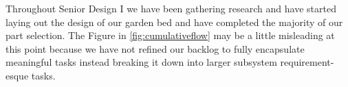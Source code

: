 Throughout Senior Design I we have been gathering research and have started laying out the design of our garden bed and have completed the majority of our part selection. The Figure in \ref{fig:cumulativeflow} may be a little misleading at this point because we have not refined our backlog to fully encapsulate meaningful tasks instead breaking it down into larger subsystem requirement-esque tasks.
